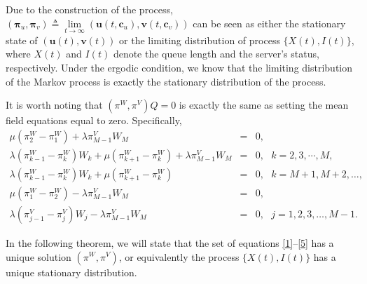 \documentclass[12pt]{article}
\newtheorem{lemma}{Lemma}[section]
\begin{document}
Due to the construction of the process, $(\mathbf{\pi}_{u},\mathbf\pi_{v})\triangleq\lim\limits_{t\to \infty}(\mathbf{u}(t,\mathbf{c}_u),\mathbf{v}(t,\mathbf{c}_v))$ can be seen as either the stationary state of $(\mathbf{u}(t),\mathbf{v}(t))$ or the limiting distribution of process $\{X(t),I(t)\}$, where $X(t)$ and $I(t)$ denote the queue length and the server's status, respectively. Under the ergodic condition, we know that the limiting distribution of the Markov process is exactly the stationary distribution of the process.

 It is worth noting that $(\pi^{W},\pi^{V})Q=0$ is exactly the same as setting the mean field equations equal to zero. Specifically,
 \begin{eqnarray}
   \label{1} \mu(\pi_{2}^{W}-\pi_{1}^{W})+\lambda \pi_{M-1}^{V}W_{M}&=&0,\\[4mm]
   \label{2} \lambda (\pi_{k-1}^{W}-\pi_{k}^{W})W_{k}+\mu(\pi_{k+1}^{W}-\pi_{k}^{W})+\lambda \pi_{M-1}^{V}W_{M}&=&0,~~~ k=2,3,\cdots,M, \\[4mm]
   \label{3}\lambda (\pi_{k-1}^{W}-\pi_{k}^{W})W_{k}+\mu(\pi_{k+1}^{W}-\pi_{k}^{W})&=&0, ~~~k=M+1,M+2,\ldots,\\[4mm]
   \label{4}\mu(\pi_{1}^{W}-\pi_{2}^{W})-\lambda \pi_{M-1}^{V}W_{M}&=&0, \\[4mm]
   \label{5} \lambda (\pi_{j-1}^{V}-\pi_{j}^{V})W_{j}-\lambda \pi_{M-1}^{V}W_{M}&=&0,~~~ j=1,2,3,\ldots,M-1.
  \end{eqnarray}

In the following theorem, we will state that the set of equations \eqref{1}--\eqref{5} has a unique solution $(\pi^{W},\pi^{V})$, or equivalently the process $\{X(t),I(t)\}$ has a unique stationary distribution.
\end{document}
